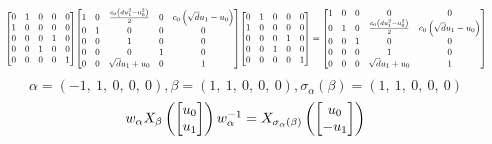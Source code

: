 \documentclass[11pt]{article}
\theoremstyle{definition}
\begin{document}
\[
\scaletoalign{\textwidth}{{\left[\begin{matrix}0 & 1 & 0 & 0 & 0\\1 & 0 & 0 & 0 & 0\\0 & 0 & 0 & 1 & 0\\0 & 0 & 1 & 0 & 0\\0 & 0 & 0 & 0 & 1\end{matrix}\right]} {\left[\begin{matrix}1 & 0 & \frac{c_{0} \left(d u_{1}^{2} - u_{0}^{2}\right)}{2} & 0 & c_{0} \left(\sqrt{d} u_{1} - u_{0}\right)\\0 & 1 & 0 & 0 & 0\\0 & 0 & 1 & 0 & 0\\0 & 0 & 0 & 1 & 0\\0 & 0 & \sqrt{d} u_{1} + u_{0} & 0 & 1\end{matrix}\right]} {\left[\begin{matrix}0 & 1 & 0 & 0 & 0\\1 & 0 & 0 & 0 & 0\\0 & 0 & 0 & 1 & 0\\0 & 0 & 1 & 0 & 0\\0 & 0 & 0 & 0 & 1\end{matrix}\right]} = {\left[\begin{matrix}1 & 0 & 0 & 0 & 0\\0 & 1 & 0 & \frac{c_{0} \left(d u_{1}^{2} - u_{0}^{2}\right)}{2} & c_{0} \left(\sqrt{d} u_{1} - u_{0}\right)\\0 & 0 & 1 & 0 & 0\\0 & 0 & 0 & 1 & 0\\0 & 0 & 0 & \sqrt{d} u_{1} + u_{0} & 1\end{matrix}\right]}}
\]
\[
\alpha = \left( -1, \  1, \  0, \  0, \  0\right), \beta = \left( 1, \  1, \  0, \  0, \  0\right), \sigma_{\alpha}(\beta) = \left( 1, \  1, \  0, \  0, \  0\right)
\]
\[
\scaletoalign{\textwidth}{w_{\alpha} X_{\beta}\left(\left[\begin{matrix}u_{0}\\u_{1}\end{matrix}\right]\right) w_{\alpha}^{-1} = X_{\sigma_{\alpha}\left(\beta\right)}\left(\left[\begin{matrix}u_{0}\\- u_{1}\end{matrix}\right]\right)}
\]
\end{document}
